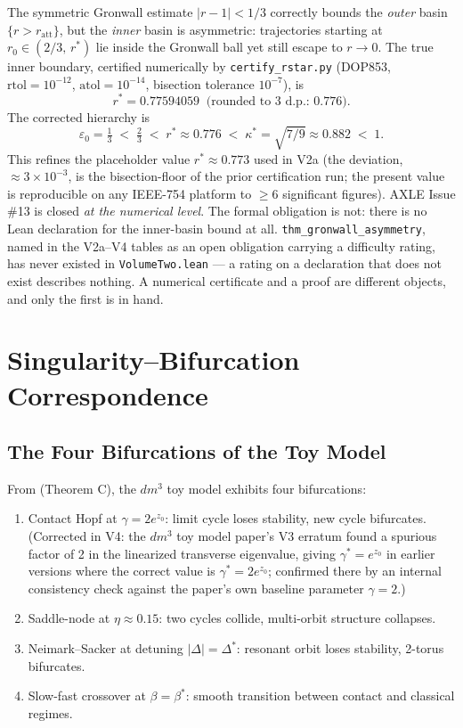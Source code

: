 \documentclass[11pt]{article}
\theoremstyle{boxed}
\begin{document}
The symmetric Gronwall estimate $|r - 1| < 1/3$ correctly bounds the \emph{outer}
basin $\{r > r_{\mathrm{att}}\}$, but the \emph{inner} basin is asymmetric: trajectories
starting at $r_0 \in (2/3,\, r^{*})$ lie inside the Gronwall ball yet still escape to
$r \to 0$. The true inner boundary, certified numerically by \texttt{certify\_rstar.py}
(DOP853, $\mathrm{rtol}=10^{-12}$, $\mathrm{atol}=10^{-14}$, bisection tolerance $10^{-7}$), is
\[
r^{*} = 0.77594059 \;\;\text{(rounded to 3 d.p.: } 0.776\text{)}.
\]
The corrected hierarchy is
\[
\varepsilon_0 = \tfrac{1}{3} \;<\; \tfrac{2}{3} \;<\; r^{*} \approx 0.776 \;<\; \kappa^{*} = \sqrt{7/9} \approx 0.882 \;<\; 1.
\]
This refines the placeholder value $r^{*} \approx 0.773$ used in V2a (the deviation,
$\approx 3\times 10^{-3}$, is the bisection-floor of the prior certification run; the
present value is reproducible on any IEEE-754 platform to $\geq 6$ significant figures).
AXLE Issue \#13 is closed \emph{at the numerical level}. The formal obligation is not: there is
no Lean declaration for the inner-basin bound at all. \texttt{thm\_gronwall\_asymmetry}, named in
the V2a--V4 tables as an open obligation carrying a difficulty rating, has never existed in
\texttt{VolumeTwo.lean} --- a rating on a declaration that does not exist describes nothing. A
numerical certificate and a proof are different objects, and only the first is in hand.

\section{Singularity--Bifurcation Correspondence}

\subsection{The Four Bifurcations of the Toy Model}

From \cite{dm3} (Theorem C), the $dm^3$ toy model exhibits four bifurcations:
\begin{enumerate}[label=(\roman*)]
  \item Contact Hopf at $\gamma = 2e^{z_0}$: limit cycle loses stability, new cycle bifurcates. (Corrected in V4: the $dm^3$ toy model paper's V3 erratum found a spurious factor of 2 in the linearized transverse eigenvalue, giving $\gamma^{*}=e^{z_0}$ in earlier versions where the correct value is $\gamma^{*}=2e^{z_0}$; confirmed there by an internal consistency check against the paper's own baseline parameter $\gamma=2$.)
  \item Saddle-node at $\eta \approx 0.15$: two cycles collide, multi-orbit structure collapses.
  \item Neimark--Sacker at detuning $|\Delta| = \Delta^{*}$: resonant orbit loses stability, 2-torus bifurcates.
  \item Slow-fast crossover at $\beta = \beta^{*}$: smooth transition between contact and classical regimes.
\end{enumerate}
\end{document}
